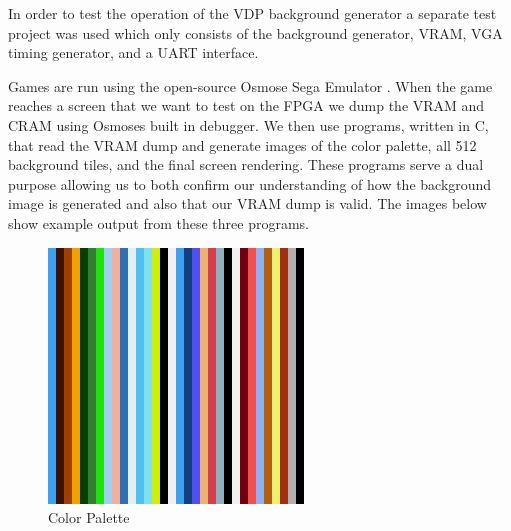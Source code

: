 \documentclass{article}
\begin{document}
In order to test the operation of the VDP background generator a separate test
project was used which only consists of the background generator, VRAM, VGA timing
generator, and a UART interface.

Games are run using the open-source Osmose Sega Emulator \cite{osmose}. When
the game reaches a screen that we want to test on the FPGA we dump the VRAM and
CRAM using Osmoses built in debugger. We then use programs, written in C, that
read the VRAM dump and generate images of the color palette, all 512 background
tiles, and the final screen rendering.  These programs serve a dual purpose
allowing us to both confirm our understanding of how the background image is
generated and also that our VRAM dump is valid. The images below show example
output from these three programs.
\vfill
\begin{figure}[H]
    \centering
    \begin{minipage}[H]{0.45\linewidth}
        \centering
        \includegraphics[width=\textwidth]{../images/palette.png}
        \caption{Color Palette}
        \label{fig:palette}
    \end{minipage}
    \hfill
    \begin{minipage}[H]{0.45\linewidth}
        \centering

\end{minipage}
\end{figure}
\end{document}
